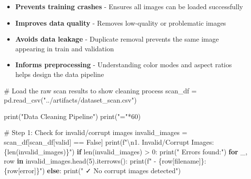 \documentclass[
  letterpaper,
  DIV=11,
  numbers=noendperiod]{scrartcl}
\newenvironment{Shaded}{\begin{snugshade}}{\end{snugshade}}
\newcommand{\BuiltInTok}[1]{\textcolor[rgb]{0.00,0.23,0.31}{#1}}
\newcommand{\CharTok}[1]{\textcolor[rgb]{0.13,0.47,0.30}{#1}}
\newcommand{\CommentTok}[1]{\textcolor[rgb]{0.37,0.37,0.37}{#1}}
\newcommand{\ControlFlowTok}[1]{\textcolor[rgb]{0.00,0.23,0.31}{\textbf{#1}}}
\newcommand{\DecValTok}[1]{\textcolor[rgb]{0.68,0.00,0.00}{#1}}
\newcommand{\KeywordTok}[1]{\textcolor[rgb]{0.00,0.23,0.31}{\textbf{#1}}}
\newcommand{\NormalTok}[1]{\textcolor[rgb]{0.00,0.23,0.31}{#1}}
\newcommand{\OperatorTok}[1]{\textcolor[rgb]{0.37,0.37,0.37}{#1}}
\newcommand{\SpecialCharTok}[1]{\textcolor[rgb]{0.37,0.37,0.37}{#1}}
\newcommand{\SpecialStringTok}[1]{\textcolor[rgb]{0.13,0.47,0.30}{#1}}
\newcommand{\StringTok}[1]{\textcolor[rgb]{0.13,0.47,0.30}{#1}}
\newcommand{\VariableTok}[1]{\textcolor[rgb]{0.07,0.07,0.07}{#1}}
\providecommand{\tightlist}{%
  \setlength{\itemsep}{0pt}\setlength{\parskip}{0pt}}
\renewenvironment{Shaded}{%
  \begin{tcolorbox}[%
    enhanced,%
    colback=codebg,%
    colframe=codebg,%
    borderline west={3pt}{0pt}{sectionblue},%
    boxrule=0pt,%
    arc=0pt,%
    boxsep=5pt,%
    left=2mm,%
    right=2mm,%
    top=2mm,%
    bottom=2mm%
  ]%
}{%
  \end{tcolorbox}%
}
\begin{document}
\begin{itemize}
\tightlist
\item
  \textbf{Prevents training crashes} - Ensures all images can be loaded
  successfully
\item
  \textbf{Improves data quality} - Removes low-quality or problematic
  images
\item
  \textbf{Avoids data leakage} - Duplicate removal prevents the same
  image appearing in train and validation
\item
  \textbf{Informs preprocessing} - Understanding color modes and aspect
  ratios helps design the data pipeline
\end{itemize}

\begin{Shaded}
\begin{Highlighting}[]
\CommentTok{\# Load the raw scan results to show cleaning process}
\NormalTok{scan\_df }\OperatorTok{=}\NormalTok{ pd.read\_csv(}\StringTok{"../artifacts/dataset\_scan.csv"}\NormalTok{)}

\BuiltInTok{print}\NormalTok{(}\StringTok{"Data Cleaning Pipeline"}\NormalTok{)}
\BuiltInTok{print}\NormalTok{(}\StringTok{"="}\OperatorTok{*}\DecValTok{60}\NormalTok{)}

\CommentTok{\# Step 1: Check for invalid/corrupt images}
\NormalTok{invalid\_images }\OperatorTok{=}\NormalTok{ scan\_df[scan\_df[}\StringTok{\textquotesingle{}valid\textquotesingle{}}\NormalTok{] }\OperatorTok{==} \VariableTok{False}\NormalTok{]}
\BuiltInTok{print}\NormalTok{(}\SpecialStringTok{f"}\CharTok{\textbackslash{}n}\SpecialStringTok{1. Invalid/Corrupt Images: }\SpecialCharTok{\{}\BuiltInTok{len}\NormalTok{(invalid\_images)}\SpecialCharTok{\}}\SpecialStringTok{"}\NormalTok{)}
\ControlFlowTok{if} \BuiltInTok{len}\NormalTok{(invalid\_images) }\OperatorTok{\textgreater{}} \DecValTok{0}\NormalTok{:}
    \BuiltInTok{print}\NormalTok{(}\StringTok{"   Errors found:"}\NormalTok{)}
    \ControlFlowTok{for}\NormalTok{ \_, row }\KeywordTok{in}\NormalTok{ invalid\_images.head(}\DecValTok{5}\NormalTok{).iterrows():}
        \BuiltInTok{print}\NormalTok{(}\SpecialStringTok{f"     {-} }\SpecialCharTok{\{}\NormalTok{row[}\StringTok{\textquotesingle{}filename\textquotesingle{}}\NormalTok{]}\SpecialCharTok{\}}\SpecialStringTok{: }\SpecialCharTok{\{}\NormalTok{row[}\StringTok{\textquotesingle{}error\textquotesingle{}}\NormalTok{]}\SpecialCharTok{\}}\SpecialStringTok{"}\NormalTok{)}
\ControlFlowTok{else}\NormalTok{:}
    \BuiltInTok{print}\NormalTok{(}\StringTok{"   ✓ No corrupt images detected"}\NormalTok{)}


\end{Highlighting}
\end{Shaded}
\end{document}
